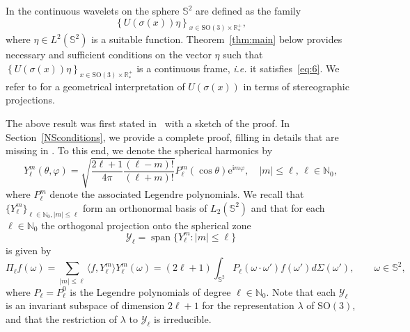\documentclass[a4paper,11pt,DIV=11,%
abstract=on%
]{scrartcl}
\def\SO{{\mathrm{SO}}}
\def\N{{\mathbb N}}
\def\R{{\mathbb R}}
\DeclareMathOperator{\Span}{span}
\newcommand{\blue}[1]{#1}
\begin{document}
{In \cite{AV99} the continuous wavelets on the sphere $\mathbb S^2 $ are defined as
the family
\[
\left\{U(\sigma(x))\eta\right\}_{x\in\SO(3)\times\R_*^+},
\]
where $\eta\in L^2(\mathbb S^2)$ is a suitable function.  Theorem~\ref{thm:main}
below provides necessary and sufficient conditions on the vector
$\eta$ such that
$\left\{U(\sigma(x))\eta\right\}_{x\in\SO(3)\times\R_*^+}$ is a
continuous frame, {\em i.e.} it satisfies~\eqref{eq:6}.   We refer to
\cite{AV99} for a geometrical interpretation of $U(\sigma(x))$ in
terms of stereographic \blue{projections}. 

The above result was first stated in~\cite{AV99} with a sketch of the
proof. In  Section~\ref{NSconditions}, we provide a complete proof, filling in  details that are missing
in \cite{AV99}. To this end,  we denote the spherical harmonics  by
$$
Y_\ell^m (\theta,\varphi) = 
	\sqrt{\frac{2\ell+1}{4\pi}\frac{(\ell-m)!}{(\ell+m)!}}
	P_{\ell}^m(\cos\theta)\mathrm{e}^{\mathrm{i} m\varphi}, \quad |m|\le \ell,\, \ell \in \mathbb N_0,
        $$
where $P_{\ell}^m$ denote the  associated Legendre polynomials. We
recall  that        
        $\{
Y_\ell^m\}_{\ell \in \N_0, |m|\leq \ell}$ 
form an orthonormal basis of $L_2(\mathbb S^2)$ and that for each $\ell\in \N_0$ 
the orthogonal projection  onto the spherical zone
\[\mathcal{Y}_\ell=\Span\{Y_\ell^m:|m|\leq\ell\}\]
is given by
\begin{equation} \label{proj}
\Pi_\ell f(\omega) = \sum_{|m|\leq \ell} \langle f , Y_\ell^m \rangle
Y_\ell^m (\omega) 
=
(2\ell + 1) \int_{\mathbb S^2} P_\ell (\omega\cdot\omega') f(\omega') d\Sigma(\omega'),\qquad\omega\in \mathbb S^2,
\end{equation}
where $P_\ell = P_\ell^0$ is the Legendre polynomials of degree $\ell \in \mathbb N_0$.
\blue{Note that each $\mathcal Y_\ell$ is an invariant subspace of dimension $2\ell+1$ for the representation $\lambda$ of $\SO(3)$, and that the restriction of $\lambda$
to $\mathcal Y_\ell$  is irreducible. 
}}
\end{document}
